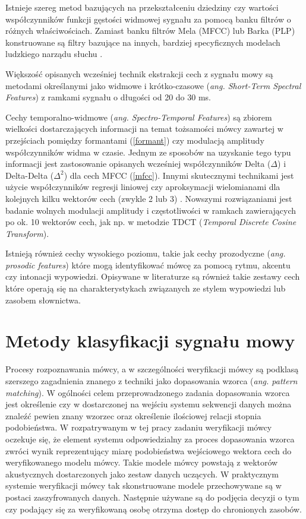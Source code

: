 Istnieje szereg metod bazujących na przekształceniu dziedziny czy wartości współczynników funkcji gęstości widmowej sygnału za pomocą banku filtrów o różnych właściwościach. Zamiast banku filtrów Mela (MFCC) lub Barka (PLP) konstruowane są filtry bazujące na innych, bardziej specyficznych modelach ludzkiego narządu słuchu \cite{fosr}.

Większość opisanych wcześniej technik ekstrakcji cech z sygnału mowy są metodami określanymi jako widmowe i krótko-czasowe (\textit{ang. Short-Term Spectral Features}) \cite{overview} z ramkami sygnału o długości od 20 do 30 ms.

Cechy temporalno-widmowe (\textit{ang. Spectro-Temporal Features}) \cite{overview} są zbiorem wielkości dostarczających informacji na temat tożsamości mówcy zawartej w przejściach pomiędzy formantami (\ref{formant}) czy modulacją amplitudy współczynników widma w czasie. Jednym ze sposobów na uzyskanie tego typu informacji jest zastosowanie opisanych wcześniej współczynników Delta ($\Delta$) i Delta-Delta ($\Delta^2$) dla cech MFCC (\ref{mfcc}). Innymi skutecznymi technikami jest użycie współczynników regresji liniowej  czy aproksymacji wielomianami dla kolejnych kilku wektorów cech (zwykle 2 lub 3) \cite{multidsp}. Nowszymi rozwiązaniami jest badanie wolnych modulacji amplitudy i częstotliwości w ramkach zawierających po ok. 10 wektorów cech, jak np. w metodzie TDCT (\textit{Temporal Discrete Cosine Transform}).

Istnieją również cechy wysokiego poziomu, takie jak cechy prozodyczne (\textit{ang. prosodic features}) które mogą identyfikować mówcę za pomocą rytmu, akcentu czy intonacji wypowiedzi. Opisywane w literaturze są również takie zestawy cech które operają się na charakterystykach związanych ze stylem wypowiedzi lub zasobem słownictwa\cite{overview}.
\section{Metody klasyfikacji sygnału mowy}
\label{featurematching}

Procesy rozpoznawania mówcy, a w szczególności weryfikacji mówcy są podklasą szerszego zagadnienia znanego z techniki jako dopasowania wzorca (\textit{ang. pattern matching}). W ogólności celem przeprowadzonego zadania dopasowania wzorca jest określenie czy w dostarczonej na wejściu systemu sekwencji danych można znaleźć pewien znany wzorzec oraz określenie ilościowej relacji stopnia podobieństwa. W rozpatrywanym w tej pracy zadaniu weryfikacji mówcy oczekuje się, że element systemu odpowiedzialny za proces dopasowania wzorca zwróci wynik reprezentujący miarę podobieństwa wejściowego wektora cech do weryfikowanego modelu mówcy. Takie modele mówcy powstają z wektorów akustycznych dostarczonych jako zestaw danych uczących. W praktycznym systemie weryfikacji mówcy tak skonstruowane modele przechowywane są w postaci zaszyfrowanych danych. Następnie używane są do podjęcia decyzji o tym czy podający się za weryfikowaną osobę otrzyma dostęp do chronionych zasobów.

